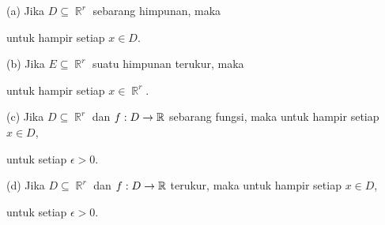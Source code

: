  (a) Jika $D\subseteq\BbbR^r$ sebarang himpunan, maka 
      
      
\noindent untuk hampir setiap $x\in D$. 
      
(b) Jika $E\subseteq\BbbR^r$ suatu himpunan terukur, maka 
      
      
\noindent untuk hampir setiap $x\in \BbbR^r$. 
      
      
(c) Jika $D\subseteq\BbbR^r$ dan $f:D\to\Bbb R$ sebarang fungsi, maka untuk 
hampir setiap $x\in D$, 
      
      
\noindent untuk setiap $\epsilon>0$. 
      
(d) Jika $D\subseteq\BbbR^r$ dan $f:D\to\Bbb R$ terukur, maka untuk hampir 
setiap $x\in D$, 
      
      
\noindent untuk setiap $\epsilon>0$. 
      
